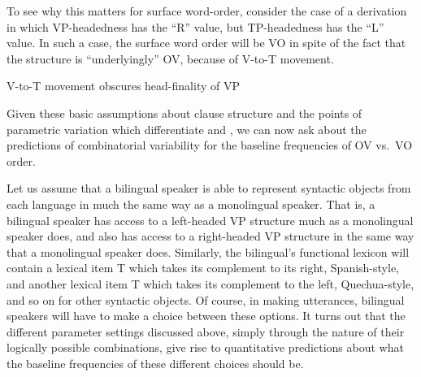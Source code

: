 \documentclass[output=paper]{langsci/langscibook}
\begin{document}
To see why this matters for surface word-order, consider the case of a
derivation in which VP-headedness has the  \enquote{R} value, but TP-headedness
has the  \enquote{L} value.  In such a case, the surface word order will be VO
in spite of the fact that the structure is “underlyingly” OV, because of V-to-T
movement.

\ea {}V-to-T movement obscures head-finality of VP\\
\z\largerpage

Given these basic assumptions about clause structure and the points of
parametric variation which differentiate  and , we can now ask
about the predictions of combinatorial variability for the baseline frequencies
of OV vs.\ VO order.

Let us assume that a bilingual speaker is able to represent syntactic objects
from each language in much the same way as a monolingual speaker.  That is, a
bilingual speaker has access to a left-headed VP structure much as a
monolingual  speaker does, and also has access to a right-headed VP
structure in the same way that a monolingual  speaker does.  Similarly,
the bilingual’s functional lexicon will contain a lexical item T which takes
its complement to its right, Spanish-style, and another lexical item T which
takes its complement to the left, Quechua-style, and so on for other syntactic
objects.  Of course, in making utterances, bilingual speakers will have to make
a choice between these options.  It turns out that the different parameter
settings discussed above, simply through the nature of their logically possible
combinations, give rise to quantitative predictions about what the baseline
frequencies of these different choices should be.
\end{document}
